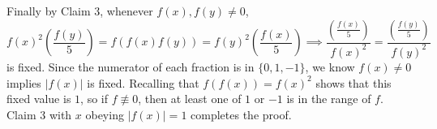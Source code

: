 Finally by Claim 3, whenever $f(x),f(y)\ne0$, \[f(x)^2\left(\frac{f(y)}5\right)=f(f(x)f(y))=f(y)^2\left(\frac{f(x)}5\right)\implies\frac{\left(\frac{f(x)}5\right)}{f(x)^2}=\frac{\left(\frac{f(y)}5\right)}{f(y)^2}\]
is fixed. Since the numerator of each fraction is in $\{0,1,-1\}$, we know $f(x)\ne0$ implies $|f(x)|$ is fixed. Recalling that $f(f(x))=f(x)^2$ shows that this fixed value is $1$, so if $f\not\equiv0$, then at least one of $1$ or $-1$ is in the range of $f$. Claim 3 with $x$ obeying $|f(x)|=1$ completes the proof.
